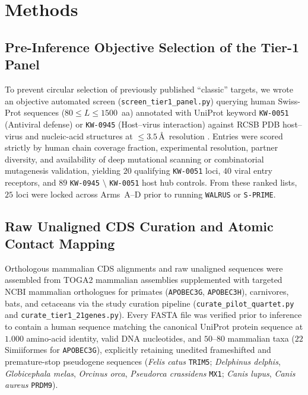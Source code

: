 \documentclass[11pt,letterpaper]{article}
\newcommand{\WALRUS}{\texttt{WALRUS}\xspace}
\newcommand{\SPRIME}{\texttt{S-PRIME}\xspace}
\begin{document}
\section{Methods}

\subsection{Pre-Inference Objective Selection of the Tier-1 Panel}

To prevent circular selection of previously published ``classic'' targets, we wrote an objective automated screen (\texttt{screen\_tier1\_panel.py}) querying human Swiss-Prot sequences ($80 \le L \le 1500$~aa) annotated with UniProt keyword \texttt{KW-0051} (Antiviral defense) or \texttt{KW-0945} (Host--virus interaction) \citep{uniprot2023uniprot} against RCSB PDB host--virus and nucleic-acid structures at $\le 3.5$\,\AA\ resolution \citep{berman2000protein}. Entries were scored strictly by human chain coverage fraction, experimental resolution, partner diversity, and availability of deep mutational scanning or combinatorial mutagenesis validation, yielding $20$ qualifying \texttt{KW-0051} loci, $40$ viral entry receptors, and $89$ \texttt{KW-0945} $\setminus$ \texttt{KW-0051} host hub controls. From these ranked lists, $25$ loci were locked across Arms~A--D prior to running \WALRUS or \SPRIME.

\subsection{Raw Unaligned CDS Curation and Atomic Contact Mapping}

Orthologous mammalian CDS alignments and raw unaligned sequences were assembled from TOGA2 mammalian assemblies \citep{kirilenko2023integrating} supplemented with targeted NCBI mammalian orthologues for primates (\texttt{APOBEC3G}, \texttt{APOBEC3H}), carnivores, bats, and cetaceans via the study curation pipeline (\texttt{curate\_pilot\_quartet.py} and \texttt{curate\_tier1\_21genes.py}). Every FASTA file was verified prior to inference to contain a human sequence matching the canonical UniProt protein sequence at $1.000$ amino-acid identity, valid DNA nucleotides, and $50$--$80$ mammalian taxa ($22$ Simiiformes for \texttt{APOBEC3G}), explicitly retaining unedited frameshifted and premature-stop pseudogene sequences (\textit{Felis catus} \texttt{TRIM5}; \textit{Delphinus delphis}, \textit{Globicephala melas}, \textit{Orcinus orca}, \textit{Pseudorca crassidens} \texttt{MX1}; \textit{Canis lupus}, \textit{Canis aureus} \texttt{PRDM9}).
\end{document}
